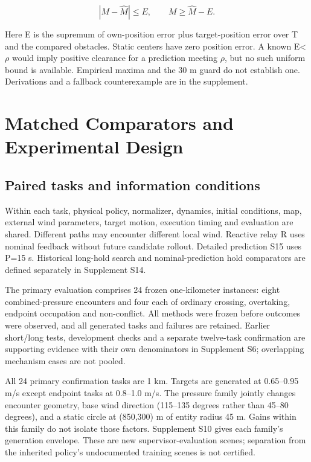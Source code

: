 \documentclass[conference]{IEEEtran}
\begin{document}
\begin{equation}\label{eq:5}
|M-\widehat M|\le E,\qquad M\ge\widehat M-E.
\end{equation}

Here E is the supremum of own-position error plus target-position error over T and the compared obstacles. Static centers have zero position error. A known E<\ensuremath{\rho} would imply positive clearance for a prediction meeting \ensuremath{\rho}, but no such uniform bound is available. Empirical maxima and the 30 m guard do not establish one. Derivations and a fallback counterexample are in the supplement.

\section{Matched Comparators and Experimental Design}

\subsection{Paired tasks and information conditions}

Within each task, physical policy, normalizer, dynamics, initial conditions, map, external wind parameters, target motion, execution timing and evaluation are shared. Different paths may encounter different local wind. Reactive relay R uses nominal feedback without future candidate rollout. Detailed prediction S15 uses P=15 s. Historical long-hold search and nominal-prediction hold comparators are defined separately in Supplement S14.

The primary evaluation comprises 24 frozen one-kilometer instances: eight combined-pressure encounters and four each of ordinary crossing, overtaking, endpoint occupation and non-conflict. All methods were frozen before outcomes were observed, and all generated tasks and failures are retained. Earlier short/long tests, development checks and a separate twelve-task confirmation are supporting evidence with their own denominators in Supplement S6; overlapping mechanism cases are not pooled.

All 24 primary confirmation tasks are 1 km. Targets are generated at 0.65--0.95 m/s except endpoint tasks at 0.8--1.0 m/s. The pressure family jointly changes encounter geometry, base wind direction (115--135 degrees rather than 45--80 degrees), and a static circle at (850,300) m of entity radius 45 m. Gains within this family do not isolate those factors. Supplement S10 gives each family's generation envelope. These are new supervisor-evaluation scenes; separation from the inherited policy's undocumented training scenes is not certified.
\end{document}
